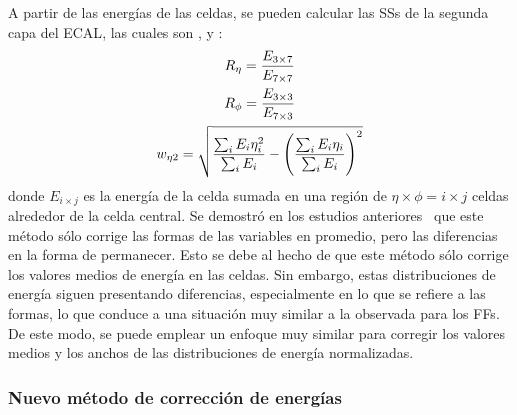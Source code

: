 A partir de las energ\'ias de las celdas, se pueden calcular las \acp{SS} de la segunda capa del \ac{ECAL}, las cuales son \reta, \rphi y \weta:
\begin{gather*}
    R_{\eta} = \frac{E_{3\times 7}}{E_{7\times 7}}\\
    R_{\phi} = \frac{E_{3\times 3}}{E_{7\times 3}}\\
    w_{\eta 2} = \sqrt{\frac{\sum_i E_i \eta^2_i}{\sum_i E_i} - \left( \frac{\sum_i E_i \eta_i}{\sum_i E_i} \right)^2}
\end{gather*}
donde \(E_{i\times j}\) es la energía de la celda sumada en una región de \(\eta\times\phi=i\times j\) celdas alrededor de la celda central. Se demostró en los estudios anteriores~\cite{thesis_belfkir} que este método sólo corrige las formas de las variables en promedio, pero las diferencias en la forma de permanecer. Esto se debe al hecho de que este método sólo corrige los valores medios de energ\'ia en las celdas. Sin embargo, estas distribuciones de energía siguen presentando diferencias, especialmente en lo que se refiere a las formas, lo que conduce a una situación muy similar a la observada para los \acp{FF}. De este modo, se puede emplear un enfoque muy similar para corregir los valores medios y los anchos de las distribuciones de energía normalizadas.
























\subsubsection{Nuevo m\'etodo de correcci\'on de energ\'ias}

